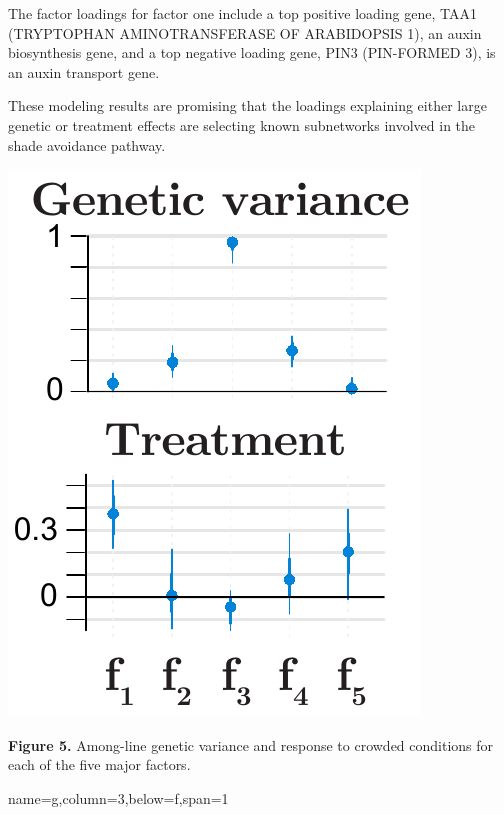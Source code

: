 \documentclass[landscape,paperwidth=48in,paperheight=36in,fontscale=0.35]{baposter}
\begin{document}
\begin{poster}
{\begin{multicols}{2}
The factor loadings for factor one include a top positive loading gene, TAA1 (TRYPTOPHAN AMINOTRANSFERASE OF ARABIDOPSIS 1), an auxin biosynthesis gene, and a top negative loading gene, PIN3 (PIN-FORMED 3), is an auxin transport gene. 

These modeling results are promising that the loadings explaining either large genetic or treatment effects are selecting known subnetworks involved in the shade avoidance pathway.
\newpage
\begin{center}
\includegraphics[width=1\columnwidth]{Figure_factors2.pdf} 
\end{center}
\textbf{Figure 5.} Among-line genetic variance and response to crowded conditions for each of the five major factors.
\end{multicols}
}
 {name=g,column=3,below=f,span=1}{


}

\end{poster}
\end{document}
